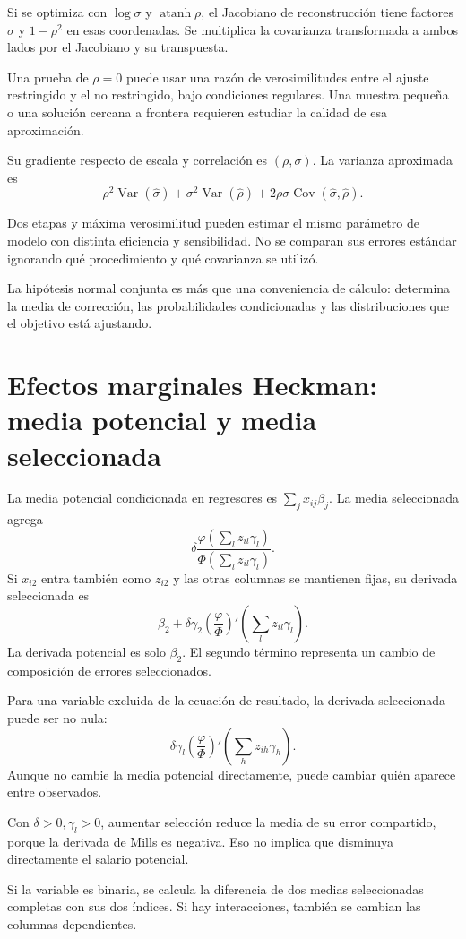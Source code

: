 \documentclass[11pt,a4paper]{article}
\DeclareMathOperator{\Var}{Var}
\DeclareMathOperator{\Cov}{Cov}
\begin{document}
Si se optimiza con
\(\log\sigma\) y
\(\operatorname{atanh}\rho\),
el Jacobiano de reconstrucción
tiene factores \(\sigma\)
y \(1-\rho^2\)
en esas coordenadas.
Se multiplica la covarianza
transformada a ambos lados
por el Jacobiano y
su transpuesta.

Una prueba de \(\rho=0\)
puede usar una razón
de verosimilitudes entre
el ajuste restringido
y el no restringido,
bajo condiciones regulares.
Una muestra pequeña o
una solución cercana a frontera
requieren estudiar la calidad
de esa aproximación.

\begin{ejemplo}[Compuesto \(\delta=\rho\sigma\)]
Su gradiente respecto de
escala y correlación es
\((\rho,\sigma)\).
La varianza aproximada es
\[
\rho^2\Var(\widehat\sigma)
+\sigma^2\Var(\widehat\rho)
+2\rho\sigma\Cov(\widehat\sigma,\widehat\rho).
\]
\end{ejemplo}
Dos etapas y máxima
verosimilitud pueden estimar
el mismo parámetro de
modelo con distinta
eficiencia y sensibilidad.
No se comparan sus
errores estándar ignorando
qué procedimiento y
qué covarianza se utilizó.

La hipótesis normal conjunta
es más que una conveniencia
de cálculo: determina
la media de corrección,
las probabilidades condicionadas
y las distribuciones que
el objetivo está ajustando.

\clearpage
\section{Efectos marginales Heckman: media potencial y media seleccionada}\label{unidad151}
La media potencial condicionada
en regresores es
\(\sum_jx_{ij}\beta_j\).
La media seleccionada agrega
\[
\delta\frac{\varphi(\sum_lz_{il}\gamma_l)}
{\Phi(\sum_lz_{il}\gamma_l)}.
\]
Si \(x_{i2}\) entra también
como \(z_{i2}\) y las
otras columnas se mantienen fijas,
su derivada seleccionada es
\[
\beta_2+\delta\gamma_2
\left(\frac{\varphi}{\Phi}\right)'
\left(\sum_lz_{il}\gamma_l\right).
\]
La derivada potencial es
solo \(\beta_2\).
El segundo término representa
un cambio de composición
de errores seleccionados.

Para una variable excluida
de la ecuación de resultado,
la derivada seleccionada
puede ser no nula:
\[
\delta\gamma_l
\left(\frac{\varphi}{\Phi}\right)'
\left(\sum_hz_{ih}\gamma_h\right).
\]
Aunque no cambie la
media potencial directamente,
puede cambiar quién
aparece entre observados.

\begin{ejemplo}[Signos]
Con \(\delta>0,\gamma_l>0\),
aumentar selección reduce
la media de su error
compartido, porque la
derivada de Mills es negativa.
Eso no implica que
disminuya directamente
el salario potencial.
\end{ejemplo}
Si la variable es binaria,
se calcula la diferencia
de dos medias seleccionadas
completas con sus dos índices.
Si hay interacciones,
también se cambian
las columnas dependientes.
\end{document}
